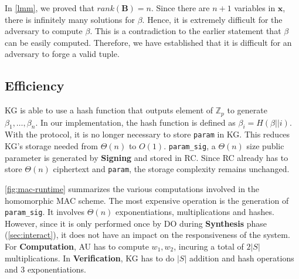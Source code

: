\documentclass[hyp,a4paper,12pt,openbib]{socreport}
\begin{document}
In \cref{lmm}, we proved that $rank(\mathbf{B}) = n$. Since there are $n+1$ variables in $\mathbf{x}$, there is infinitely many solutions for $\beta$. Hence, it is extremely difficult for the adversary to compute $\beta$. This is a contradiction to the earlier statement that $\beta$ can be easily computed. Therefore, we have established that it is difficult for an adversary to forge a valid tuple.

\subsection{Efficiency}
\label{sec:homo-speed}
KG is able to use a hash function that outputs element of $\mathbb{Z}_p$ to generate $\beta_1, \dots, \beta_n$. In our implementation, the hash function is defined as $\beta_i = H(\beta || i)$. With the protocol, it is no longer necessary to store \texttt{param} in KG. This reduces KG's storage needed from $\Theta(n)$ to $O(1)$. \texttt{param\_sig}, a $\Theta(n)$ size public parameter is generated by \textbf{Signing} and stored in RC. Since RC already has to store $\Theta(n)$ ciphertext and \texttt{param}, the storage complexity remains unchanged.

\cref{fig:mac-runtime} summarizes the various computations involved in the homomorphic MAC scheme. The most expensive operation is the generation of \texttt{param\_sig}. It involves $\Theta(n)$ exponentiations, multiplications and hashes. However, since it is only performed once by DO during \textbf{Synthesis} phase (\cref{sec:interact}), it does not have an impact on the responsiveness of the system. For \textbf{Computation}, AU has to compute $w_1, w_2$, incuring a total of $2|S|$ multiplications. In \textbf{Verification}, KG has to do $|S|$ addition and hash operations and $3$ exponentiations.
\end{document}
